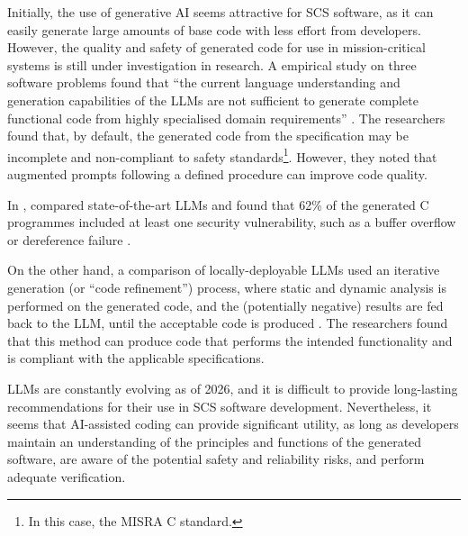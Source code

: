 \documentclass[a4paper,nobib,justified,final]{tufte-book}
\begin{document}
Initially, the use of generative \acs{AI} seems attractive for \acs{SCS} software, as it can easily generate large amounts of base code with less effort from developers. However, the quality and safety of generated code for use in mission-critical systems is still under investigation in research. A \citeyear{liuEmpiricalStudyCode2024} empirical study on three software problems found that ``the current language understanding and generation capabilities of the LLMs are not sufficient to generate complete functional code from highly specialised domain requirements'' \autocite{liuEmpiricalStudyCode2024}. The researchers found that, by default, the generated code from the specification may be incomplete and non-compliant to safety standards\footnote{In this case, the MISRA C standard.}. However, they noted that augmented prompts following a defined procedure can improve code quality.

In \citeyear{tihanyiHowSecureAIgenerated2025}, \citeauthor{tihanyiHowSecureAIgenerated2025} compared state-of-the-art \acsp{LLM} and found that 62\% of the generated C programmes included at least one security vulnerability, such as a buffer overflow or dereference failure \autocite{tihanyiHowSecureAIgenerated2025}.

On the other hand, a \citeyear{kirchnerGeneratingAutomotiveCode2025} comparison of locally-deployable \acsp{LLM} used an iterative generation (or ``code refinement'') process, where static and dynamic analysis is performed on the generated code, and the (potentially negative) results are fed back to the \acs{LLM}, until the acceptable code is produced \autocite{kirchnerGeneratingAutomotiveCode2025}. The researchers found that this method can produce code that performs the intended functionality and is compliant with the applicable specifications.

\acsp{LLM} are constantly evolving as of 2026, and it is difficult to provide long-lasting recommendations for their use in \acs{SCS} software development. Nevertheless, it seems that \acs{AI}-assisted coding can provide significant utility, as long as developers maintain an understanding of the principles and functions of the generated software, are aware of the potential safety and reliability risks, and perform adequate verification.
\end{document}
